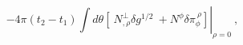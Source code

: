 \begin{equation}
-4\pi(t_2-t_1)\left.\int d\theta\left[ \ N^{\perp}_{,\rho} \delta g^{1/2}
 \ + N^{\phi}\delta\pi_{\phi}^{\ \rho} \right]\right|_{\rho=0} \ ,
\label{surface}
\end{equation}


